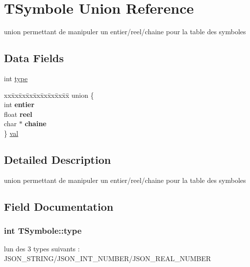 \hypertarget{structTSymbole}{}\section{T\+Symbole Union Reference}
\label{structTSymbole}


union permettant de manipuler un entier/reel/chaine pour la table des symboles  


\subsection*{Data Fields}
\begin{DoxyCompactItemize}
\item 
int \hyperlink{structTSymbole_a3f1c09d456d42f56c7e97b767fcda611}{type}
\item 
\begin{tabbing}
xx\=xx\=xx\=xx\=xx\=xx\=xx\=xx\=xx\=\kill
union \{\\
\>int {\bfseries entier}\\
\>float {\bfseries reel}\\
\>char $\ast$ {\bfseries chaine}\\
\} \hyperlink{structTSymbole_a448dc40c2c8e5d050436fa598f528723}{val}\\

\end{tabbing}\end{DoxyCompactItemize}


\subsection{Detailed Description}
union permettant de manipuler un entier/reel/chaine pour la table des symboles 

\subsection{Field Documentation}
\subsubsection[{\texorpdfstring{type}{type}}]{\setlength{\rightskip}{0pt plus 5cm}int T\+Symbole\+::type}\hypertarget{structTSymbole_a3f1c09d456d42f56c7e97b767fcda611}{}\label{structTSymbole_a3f1c09d456d42f56c7e97b767fcda611}
l\textquotesingle{}un des 3 types suivants \+: J\+S\+O\+N\+\_\+\+S\+T\+R\+I\+N\+G/\+J\+S\+O\+N\+\_\+\+I\+N\+T\+\_\+\+N\+U\+M\+B\+E\+R/\+J\+S\+O\+N\+\_\+\+R\+E\+A\+L\+\_\+\+N\+U\+M\+B\+ER 
